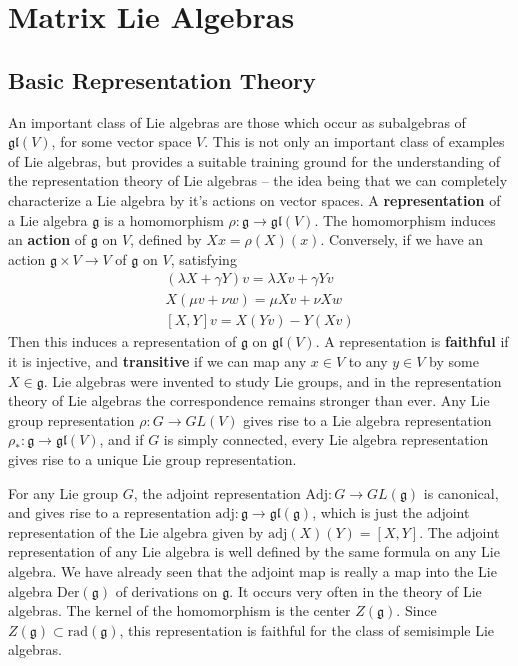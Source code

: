 \chapter{Matrix Lie Algebras}

\section{Basic Representation Theory}

An important class of Lie algebras are those which occur as subalgebras of $\mathfrak{gl}(V)$, for some vector space $V$. This is not only an important class of examples of Lie algebras, but provides a suitable training ground for the understanding of the representation theory of Lie algebras -- the idea being that we can completely characterize a Lie algebra by it's actions on vector spaces. A {\bf representation} of a Lie algebra $\mathfrak{g}$ is a homomorphism $\rho: \mathfrak{g} \to \mathfrak{gl}(V)$. The homomorphism induces an {\bf action} of $\mathfrak{g}$ on $V$, defined by $Xx = \rho(X)(x)$. Conversely, if we have an action $\mathfrak{g} \times V \to V$ of $\mathfrak{g}$ on $V$, satisfying
%
\begin{align*}
    (\lambda X + \gamma Y)v = \lambda Xv + \gamma Yv\\
    X(\mu v + \nu w) = \mu Xv + \nu Xw\\
    [X,Y] v = X(Yv) - Y(Xv)
\end{align*}
%
Then this induces a representation of $\mathfrak{g}$ on $\mathfrak{gl}(V)$. A representation is {\bf faithful} if it is injective, and {\bf transitive} if we can map any $x \in V$ to any $y \in V$ by some $X \in \mathfrak{g}$. Lie algebras were invented to study Lie groups, and in the representation theory of Lie algebras the correspondence remains stronger than ever. Any Lie group representation $\rho: G \to GL(V)$ gives rise to a Lie algebra representation $\rho_*: \mathfrak{g} \to \mathfrak{gl}(V)$, and if $G$ is simply connected, every Lie algebra representation gives rise to a unique Lie group representation.

\begin{example}
    For any Lie group $G$, the adjoint representation $\text{Adj}: G \to GL(\mathfrak{g})$ is canonical, and gives rise to a representation $\text{adj}: \mathfrak{g} \to \mathfrak{gl}(\mathfrak{g})$, which is just the adjoint representation of the Lie algebra given by $\text{adj}(X)(Y) = [X,Y]$. The adjoint representation of any Lie algebra is well defined by the same formula on any Lie algebra. We have already seen that the adjoint map is really a map into the Lie algebra $\text{Der}(\mathfrak{g})$ of derivations on $\mathfrak{g}$. It occurs very often in the theory of Lie algebras. The kernel of the homomorphism is the center $Z(\mathfrak{g})$. Since $Z(\mathfrak{g}) \subset \text{rad}(\mathfrak{g})$, this representation is faithful for the class of semisimple Lie algebras.
\end{example}

